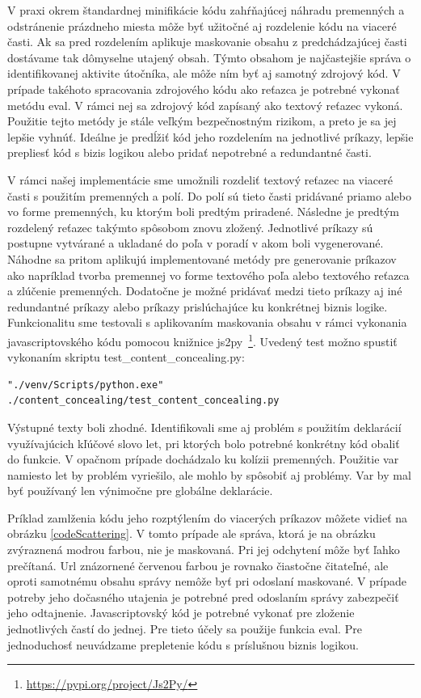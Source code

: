 \documentclass[conference, 11pt,slovak,a4paper,twoside]{IEEEtran}
\begin{document}
V praxi okrem štandardnej minifikácie kódu zahŕňajúcej náhradu premenných a odstránenie prázdneho miesta môže byť užitočné aj rozdelenie kódu na viaceré časti. Ak sa pred rozdelením aplikuje maskovanie obsahu z predchádzajúcej časti dostávame tak dômyselne utajený obsah. Týmto obsahom je najčastejšie správa o identifikovanej aktivite útočníka, ale môže ním byť aj samotný zdrojový kód. V prípade takéhoto spracovania zdrojového kódu ako reťazca je potrebné vykonať metódu eval. V rámci nej sa zdrojový kód zapísaný ako textový reťazec vykoná. Použitie tejto metódy je stále veľkým bezpečnostným rizikom, a preto je sa jej lepšie vyhnúť. Ideálne je predĺžiť kód jeho rozdelením na jednotlivé príkazy, lepšie prepliesť kód s bizis logikou alebo pridať nepotrebné a redundantné časti.

V rámci našej implementácie sme umožnili rozdeliť textový reťazec na viaceré časti s použitím premenných a polí. Do polí sú tieto časti pridávané priamo alebo vo forme premenných, ku ktorým boli predtým priradené. Následne je predtým rozdelený reťazec takýmto spôsobom znovu zložený. Jednotlivé príkazy sú postupne vytvárané a ukladané do poľa v poradí v akom boli vygenerované. Náhodne sa pritom aplikujú implementované metódy pre generovanie príkazov ako napríklad tvorba premennej vo forme textového poľa alebo textového reťazca a zlúčenie premenných. Dodatočne je možné pridávať medzi tieto príkazy aj iné redundantné príkazy alebo príkazy prislúchajúce ku konkrétnej biznis logike. Funkcionalitu sme testovali s aplikovaním maskovania obsahu v rámci vykonania javascriptovského kódu pomocou knižnice js2py~\footnote{\url{https://pypi.org/project/Js2Py/}}. Uvedený test možno spustiť vykonaním skriptu test\_content\_concealing.py:

\begin{lstlisting}
"./venv/Scripts/python.exe" ./content_concealing/test_content_concealing.py
\end{lstlisting}


Výstupné texty boli zhodné. Identifikovali sme aj problém s použitím deklarácií využívajúcich kľúčové slovo let, pri ktorých bolo potrebné konkrétny kód obaliť do funkcie. V opačnom prípade dochádzalo ku kolízii premenných. Použitie var namiesto let by problém vyriešilo, ale mohlo by spôsobiť aj problémy. Var by mal byť používaný len výnimočne pre globálne deklarácie. 

Príklad zamlženia kódu jeho rozptýlením do viacerých príkazov môžete vidieť na obrázku \ref{codeScattering}. V tomto prípade ale správa, ktorá je na obrázku zvýraznená modrou farbou, nie je maskovaná. Pri jej odchytení môže byť ľahko prečítaná. Url znázornené červenou farbou je rovnako čiastočne čitateľné, ale oproti samotnému obsahu správy nemôže byť pri odoslaní maskované. V prípade potreby jeho dočasného utajenia je potrebné pred odoslaním správy zabezpečiť jeho odtajnenie. Javascriptovský kód je potrebné vykonať pre zloženie jednotlivých častí do jednej. Pre tieto účely sa použije funkcia eval. Pre jednoduchosť neuvádzame prepletenie kódu s príslušnou biznis logikou.
\end{document}
